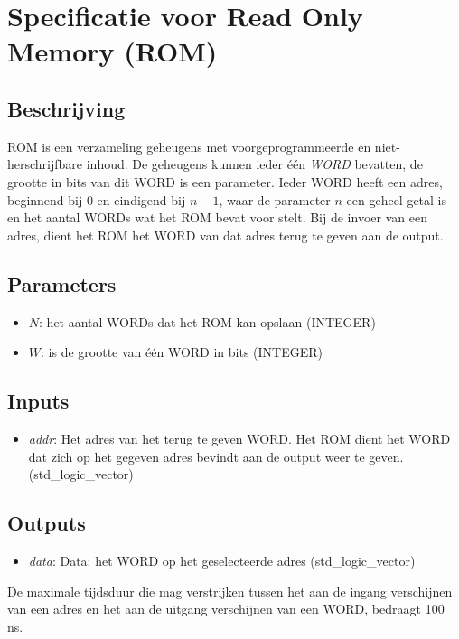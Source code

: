 \documentclass{article}
\begin{document}
\section{Specificatie voor Read Only Memory (ROM)}
\subsection{Beschrijving}
ROM is een verzameling geheugens met voorgeprogrammeerde en niet-herschrijfbare inhoud. De geheugens kunnen ieder één \textit{WORD} bevatten, de grootte in bits van dit WORD is een parameter. Ieder WORD heeft een adres, beginnend bij 0 en eindigend bij $n-1$, waar de parameter $n$ een geheel getal is en het aantal WORDs wat het ROM bevat voor stelt. Bij de invoer van een adres, dient het ROM het WORD van dat adres terug te geven aan de output.
\subsection{Parameters}
\begin{itemize}
	\item $N$: het aantal WORDs dat het ROM kan opslaan (INTEGER)
	\item $W$: is de grootte van één WORD in bits (INTEGER)
\end{itemize}
\subsection{Inputs}
\begin{itemize}
	\item \textit{addr}: Het adres van het terug te geven WORD. Het ROM dient het WORD dat zich op het gegeven adres bevindt aan de output weer te geven. (std\_logic\_vector)
\end{itemize}
\subsection{Outputs}
\begin{itemize}
	\item  \textit{data}: Data: het WORD op het geselecteerde adres (std\_logic\_vector)
\end{itemize}
De maximale tijdsduur die mag verstrijken tussen het aan de ingang verschijnen van een adres en het aan de uitgang verschijnen van een WORD, bedraagt 100 ns.
\end{document}
